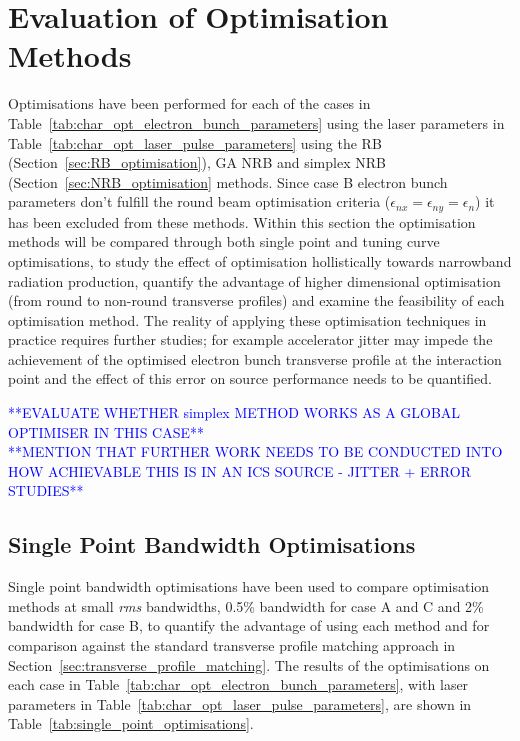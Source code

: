\documentclass[../main.tex]{subfiles}
\begin{document}
\section{Evaluation of Optimisation Methods} 
\label{sec:evaluation_of_optimisation_methods}

Optimisations have been performed for each of the cases in Table~\ref{tab:char_opt_electron_bunch_parameters} using the laser parameters in Table~\ref{tab:char_opt_laser_pulse_parameters} using the RB (Section~\ref{sec:RB_optimisation}), GA NRB and simplex NRB (Section~\ref{sec:NRB_optimisation} methods. Since case B electron bunch parameters don't fulfill the round beam optimisation criteria ($\epsilon_{nx} = \epsilon_{ny} = \epsilon_{n}$) it has been excluded from these methods. Within this section the optimisation methods will be compared through both single point and tuning curve optimisations, to study the effect of optimisation hollistically towards narrowband radiation production, quantify the advantage of higher dimensional optimisation (from round to non-round transverse profiles) and examine the feasibility of each optimisation method. The reality of applying these optimisation techniques in practice requires further studies; for example accelerator jitter may impede the achievement of the optimised electron bunch transverse profile at the interaction point and the effect of this error on source performance needs to be quantified.   


\textcolor{blue}{**EVALUATE WHETHER simplex METHOD WORKS AS A GLOBAL OPTIMISER IN THIS CASE** \\ **MENTION THAT FURTHER WORK NEEDS TO BE CONDUCTED INTO HOW ACHIEVABLE THIS IS IN AN ICS SOURCE - JITTER + ERROR STUDIES** \\}

\subsection{Single Point Bandwidth Optimisations}

Single point bandwidth optimisations have been used to compare optimisation methods at small \textit{rms} bandwidths, 0.5\%  bandwidth for case A and C and 2\%  bandwidth for case B, to quantify the advantage of using each method and for comparison against the standard transverse profile matching approach in Section~\ref{sec:transverse_profile_matching}. The results of the optimisations on each case in Table~\ref{tab:char_opt_electron_bunch_parameters}, with laser parameters in Table~\ref{tab:char_opt_laser_pulse_parameters}, are shown in Table~\ref{tab:single_point_optimisations}. 
\end{document}
